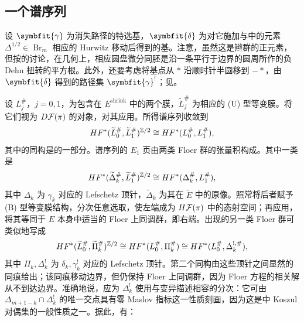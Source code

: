 \clearpage
\subsection{一个谱序列}\label{sec:18l}
设 $\symbfit{\gamma}$ 为消失路径的特选基，$\symbfit{\delta}$ 为对它施加与中的元素 $\Delta^{1/2}\in\operatorname{Br}_m$ 相应的 Hurwitz 移动后得到的基。注意，虽然这是辫群的正元素，但按的讨论，在几何上，相应圆盘微分同胚是沿一条平行于边界的圆周所作的负 Dehn 扭转的平方根。此外，还要考虑将基点从 $*$ 沿顺时针半圆移到 $-*$，由 $\symbfit{\delta}$ 得到的路径集 $\symbfit{\gamma}^!$；见。

设 $L_j^\#$，$j=0,1$，为包含在 $E^{\mathrm{shrink}}$ 中的两个膜，$\widetilde L_j^\#$ 为相应的 (U) 型等变膜。将它们视为 $D\mathcal F(\pi)$ 的对象，对其应用。所得谱序列收敛到
\[
HF^*(\widetilde L_0^\#,\widetilde L_1^\#)^{\mathbb Z/2}\cong HF^*(L_0^\#,L_1^\#),
\]
其中的同构是的一部分。谱序列的 $E_1$ 页由两类 Floer 群的张量积构成。其中一类是
\begin{equation}\label{eq:18.31}
HF^*(\widetilde\Delta_k^\#,\widetilde L_1^\#)^{\mathbb Z/2}\cong HF^*(\Delta_k^\#,L_1^\#),
\end{equation}
其中 $\Delta_k$ 为 $\gamma_k$ 对应的 Lefschetz 顶针，$\widetilde\Delta_k$ 为其在 $\widetilde E$ 中的原像。照常将后者赋予 (B) 型等变膜结构，分次任意选取，使左端成为 $H\mathcal F(\pi)$ 中的态射空间；再应用，将其等同于 $E$ 本身中适当的 Floer 上同调群，即右端。出现的另一类 Floer 群可类似地写成
\[
HF^*(\widetilde L_0^\#,\widetilde\Pi_k^\#)^{\mathbb Z/2}
\cong HF^*(L_0^\#,\Pi_k^\#)
\cong HF^*(L_0^\#,\Delta_k^{!,\#}),
\]
其中 $\Pi_k,\Delta_k^!$ 为 $\delta_k,\gamma_k^!$ 对应的 Lefschetz 顶针。第二个同构由这些顶针之间显然的同痕给出；该同痕移动边界，但仍保持 Floer 上同调群，因为 Floer 方程的相关解从不到达边界。准确地说，应为 $\Delta_k^!$ 使用与变异描述相容的分次：它可由 $\Delta_{m+1-k}\cap\Delta_k^!$ 的唯一交点具有零 Maslov 指标这一性质刻画，因为这是中 Koszul 对偶集的一般性质之一。据此，有：


